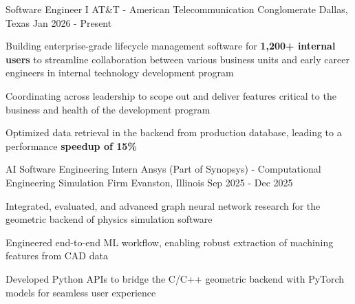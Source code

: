 

\begin{cventries}

  \cventry
    {Software Engineer I} %
    {AT\&T - American Telecommunication Conglomerate} %
    {Dallas, Texas} %
    {Jan 2026 - Present} %
    {
      \begin{cvitems} %
        \item {Building enterprise-grade lifecycle management software for \textbf{1,200+ internal users} to streamline collaboration between various business units and early career engineers in internal technology development program}
        \item {Coordinating across leadership to scope out and deliver features critical to the business and health of the development program}
        \item {Optimized data retrieval in the backend from production database, leading to a performance \textbf{speedup of 15\%}}
      \end{cvitems}
    }

  \cventry
    {AI Software Engineering Intern} %
    {Ansys (Part of Synopsys) - Computational Engineering Simulation Firm} %
    {Evanston, Illinois} %
    {Sep 2025 - Dec 2025} %
    {
      \begin{cvitems} %
        \item {Integrated, evaluated, and advanced graph neural network research for the geometric backend of physics simulation software}
        \item {Engineered end-to-end ML workflow, enabling robust extraction of machining features from CAD data}
        \item {Developed Python APIs to bridge the C/C++ geometric backend with PyTorch models for seamless user experience}
      \end{cvitems}
    }


\end{cventries}
